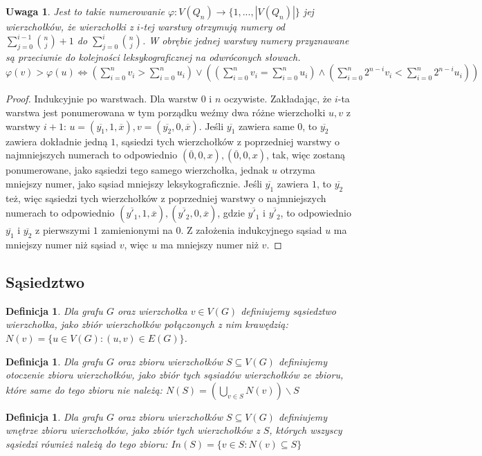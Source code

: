 \documentclass{pracamgr}
\newtheorem{defi}[theorem]{Definicja}
\newtheorem{remark}[theorem]{Uwaga}
\begin{document}
    \begin{remark}\label{numerowanie warstwowe 2}
     Jest to takie numerowanie $\varphi:V(Q_n)\rightarrow\{1,...,|V(Q_n)|\}$ jej wierzchołków,
     że wierzchołki z $i$-tej warstwy otrzymują numery od $\sum_{j=0}^{i-1}{n\choose j}+1$ do $\sum_{j=0}^{i}{n\choose j}$.
     W obrębie jednej warstwy numery przyznawane są przeciwnie do kolejności leksykograficznej na odwróconych słowach.
     $\varphi(v)>\varphi(u)\Leftrightarrow (\sum_{i=0}^n v_i>\sum_{i=0}^n u_i)
     \vee((\sum_{i=0}^n v_i=\sum_{i=0}^n u_i)\wedge(\sum_{i=0}^n2^{n-i}v_i<\sum_{i=0}^n2^{n-i}u_i))$
    \end{remark}
    \begin{proof}
     Indukcyjnie po warstwach.\newline
     Dla warstw $0$ i $n$ oczywiste.\newline
     Zakładając, że $i$-ta warstwa jest ponumerowana w tym porządku weźmy dwa różne wierzchołki $u,v$ z warstwy $i+1$:
     $u=(\overline{y_1},1,\overline{x}),v=(\overline{y_2},0,\overline{x})$.\newline
     Jeśli $\overline{y_1}$ zawiera same $0$, to $\overline{y_2}$ zawiera dokładnie jedną $1$, sąsiedzi tych wierzchołków z poprzedniej warstwy
     o najmniejszych numerach to odpowiednio $(\overline{0},0,x),(\overline{0},0,x)$,
     tak, więc zostaną ponumerowane, jako sąsiedzi tego samego wierzchołka, jednak $u$ otrzyma mniejszy numer, jako sąsiad mniejszy leksykograficznie.\newline
     Jeśli $\overline{y_1}$ zawiera $1$, to $\overline{y_2}$ też, więc sąsiedzi tych wierzchołków z poprzedniej warstwy
     o najmniejszych numerach to odpowiednio $(\overline{y'_1},1,\overline{x}),(\overline{y'_2},0,\overline{x})$, gdzie $\overline{y'_1}$ i $\overline{y'_2}$,
     to odpowiednio $\overline{y_1}$ i $\overline{y_2}$ z pierwszymi $1$ zamienionymi na $0$. Z założenia indukcyjnego sąsiad $u$ ma mniejszy numer niż sąsiad $v$,
     więc $u$ ma mniejszy numer niż $v$.
    \end{proof}
   \subsection{Sąsiedztwo}
    \begin{defi}\label{sasiedztwo wierzcholka}
     Dla grafu $G$ oraz wierzchołka $v\in V(G)$ definiujemy \emph{sąsiedztwo wierzchołka}, jako zbiór wierzchołków połączonych z nim krawędzią:
     $N(v)=\{u\in V(G):(u,v)\in E(G)\}$.
    \end{defi}
    \begin{defi}\label{otoczenie zbioru wierzcholkow}
     Dla grafu $G$ oraz zbioru wierzchołków $S\subseteq V(G)$ definiujemy \emph{otoczenie zbioru wierzchołków}, jako zbiór tych sąsiadów wierzchołków ze zbioru,
     które same do tego zbioru nie należą: $N(S)=(\bigcup_{v\in S}N(v))\backslash S$
    \end{defi}
    \begin{defi}\label{wnetrze zbioru wierzcholkow}
     Dla grafu $G$ oraz zbioru wierzchołków $S\subseteq V(G)$ definiujemy \emph{wnętrze zbioru wierzchołków}, jako zbiór tych wierzchołków z $S$,
     których wszyscy sąsiedzi również należą do tego zbioru: $In(S)=\{v\in S:N(v)\subseteq S\}$
    \end{defi}
\end{document}
